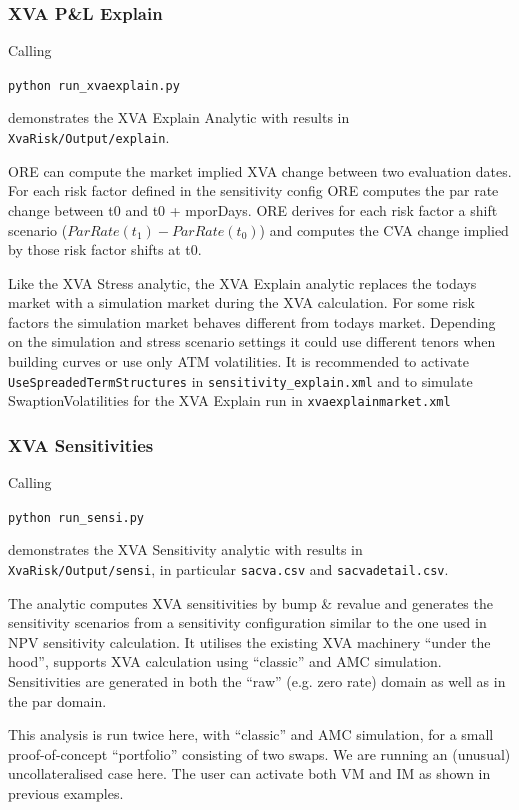 \subsubsection{XVA P\&L Explain}\label{example:xvarisk_pnl}

Calling

\medskip
\centerline {\tt python run\_xvaexplain.py} 

\medskip
demonstrates the XVA Explain Analytic with results in {\tt XvaRisk/Output/explain}.

ORE can compute the market implied XVA change between two evaluation dates.
For each risk factor defined in the sensitivity config ORE computes the par rate change between t0
and t0 + mporDays.  ORE derives for each risk factor a shift scenario ($ParRate(t_1) - ParRate(t_0)$)
and computes the CVA change implied by those risk factor shifts at t0.

Like the XVA Stress analytic,
the XVA Explain analytic replaces the todays market with a simulation market during the XVA calculation.
For some risk factors the simulation market behaves different from todays market.
Depending on the simulation and stress scenario settings it could use different tenors when building curves 
or use only ATM volatilities. It is recommended to activate {\tt UseSpreadedTermStructures} in
{\tt sensitivity\_explain.xml} and to simulate SwaptionVolatilities for the XVA Explain run
in {\tt xvaexplainmarket.xml}

\subsubsection{XVA Sensitivities}\label{example:xvarisk_sensi}

Calling

\medskip
\centerline {\tt python run\_sensi.py} 

\medskip
demonstrates the XVA Sensitivity analytic with results in {\tt XvaRisk/Output/sensi}, in particular
{\tt sacva.csv} and {\tt sacvadetail.csv}.

The analytic computes XVA sensitivities by bump \& revalue and generates the sensitivity scenarios from a
sensitivity configuration similar to the one used in NPV sensitivity calculation. It utilises the existing
XVA machinery ``under the hood'', supports XVA calculation using ``classic'' and AMC simulation.
Sensitivities are generated in both the ``raw'' (e.g. zero rate) domain as well as in the par domain.

This analysis is run twice here, with ``classic'' and AMC simulation, for a small proof-of-concept
``portfolio'' consisting of two swaps. We are running an (unusual) uncollateralised case here. The user
can activate both VM and IM as shown in previous examples.

